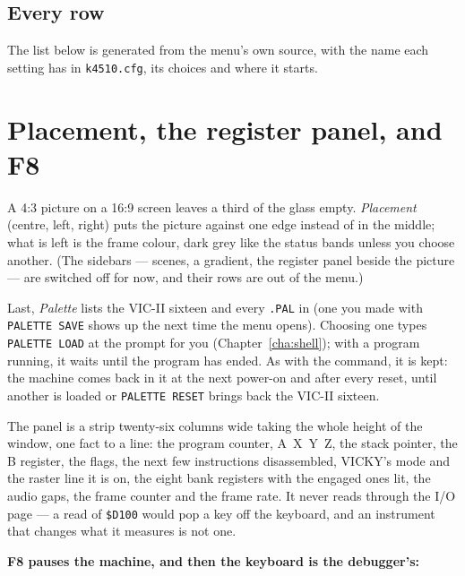 \subsection*{Every row}
The list below is generated from the menu's own source, with the name
each setting has in \texttt{k4510.cfg}, its choices and where it starts.



\section{Placement, the register panel, and F8}
A 4:3 picture on a 16:9 screen leaves a third of the glass empty.
\emph{Placement} (centre, left, right) puts the picture against one edge
instead of in the middle; what is left is the frame colour, dark grey
like the status bands unless you choose another. (The sidebars --- scenes,
a gradient, the register panel beside the picture --- are switched off
for now, and their rows are out of the menu.)

Last, \emph{Palette} lists the VIC-II sixteen and every \texttt{.PAL} in
 (one you made with \verb|PALETTE SAVE| shows up
the next time the menu opens). Choosing one types \verb|PALETTE LOAD| at the
prompt for you (Chapter~\ref{cha:shell}); with a program running, it waits
until the program has ended. As with the command, it is kept: the
machine comes back in it at the next power-on and after every reset,
until another is loaded or \verb|PALETTE RESET| brings back the VIC-II
sixteen.

The panel is a strip twenty-six columns wide taking the whole height of
the window, one fact to a line: the program counter, A~X~Y~Z, the stack
pointer, the B register, the flags, the next few instructions
disassembled, VICKY's mode and the raster line it is on, the eight bank
registers with the engaged ones lit, the audio gaps, the frame counter
and the frame rate. It never reads through the I/O page --- a read of
\texttt{\$D100} would pop a key off the keyboard, and an instrument that
changes what it measures is not one.

\textbf{F8 pauses the machine, and then the keyboard is the debugger's:}


